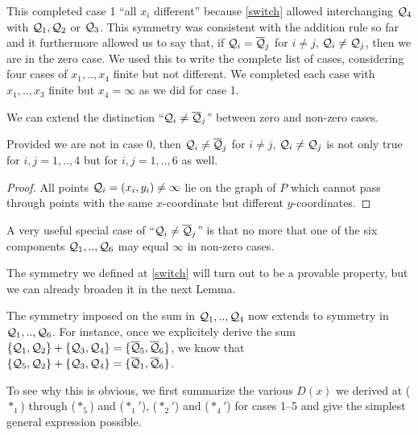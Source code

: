 \documentclass[english,11pt,a4paper]{article}
\begin{document}
This completed case 1 ``all $x_i$ different'' because \eqref{switch} allowed interchanging $\mathcal{Q}_4$ with $\mathcal{Q}_1, \mathcal{Q}_2$ or $\mathcal{Q}_3$. This symmetry was consistent with the addition rule so far and it furthermore allowed us to say that, if $\mathcal{Q}_i = \overline {\mathcal{Q}}_j$ for $i \neq j$, $\mathcal{Q}_i \neq \mathcal{Q}_j$, then we are in the zero case. We used this to write the complete list of cases, considering four cases of $x_1,..,x_4$ finite but not different. We completed each case with $x_1,..,x_3$ finite but $x_4 = \infty$ as we did for case 1.

We can extend the distinction ``$\mathcal{Q}_i \neq \overline {\mathcal{Q}}_j$'' between zero and non-zero cases.

\begin{lemma}\label{atmost1}
  Provided we are not in case 0, then $\mathcal{Q}_i \neq \overline {\mathcal{Q}}_j$ for $i \neq j$, $\mathcal{Q}_i \neq \mathcal{Q}_j$ is not only true for $i,j = 1,..,4$ but for $i,j = 1,..,6$ as well.

  \begin{proof}
    All points $\mathcal{Q}_i = (x_i,y_i) \neq \infty$ lie on the graph of $P$ which cannot pass through points with the same $x$-coordinate but different $y$-coordinates.
  \end{proof}

  A very useful special case of ``$\mathcal{Q}_i \neq \overline {\mathcal{Q}}_j$'' is that no more that one of the six components $\mathcal{Q}_1,.., \mathcal{Q}_6$ may equal $\infty$ in non-zero cases.
\end{lemma}

The symmetry we defined at \eqref{switch} will turn out to be a provable property, but we can already broaden it in the next Lemma.

\begin{lemma}\label{symall}
  The symmetry imposed on the sum in $\mathcal{Q}_1, .., \mathcal{Q}_4$ now extends to symmetry in $\mathcal{Q}_1, .., \mathcal{Q}_6$. For instance, once we explicitely derive the sum $\{\mathcal{Q}_1, \mathcal{Q}_2 \} +\{ \mathcal{Q}_3 , \mathcal{Q}_4 \} = \{\overline {\mathcal{Q}}_5 , \overline {\mathcal{Q}}_6\}$, we know that $\{\mathcal{Q}_5, \mathcal{Q}_2 \} +\{ \mathcal{Q}_3 , \mathcal{Q}_4 \} = \{\overline {\mathcal{Q}}_1 , \overline {\mathcal{Q}}_6\}$.
\end{lemma}

To see why this is obvious, we first summarize the various $D(x)$ we derived at ($*_1$) through ($*_5$) and ($*_1'$), ($*_2'$) and ($*_4'$) for cases 1--5 and give the simplest general expression possible.
\end{document}
